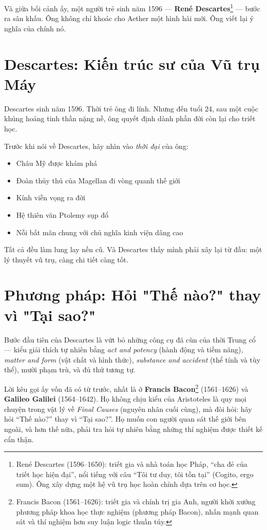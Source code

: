 Và giữa bối cảnh ấy, một người trẻ sinh năm 1596 — \textbf{René Descartes}\footnote{René Descartes (1596--1650): triết gia và nhà toán học Pháp, “cha đẻ của triết học hiện đại”, nổi tiếng với câu “Tôi tư duy, tôi tồn tại” (Cogito, ergo sum). Ông xây dựng một hệ vũ trụ học hoàn chỉnh dựa trên cơ học.} — bước ra sân khấu. Ông không chỉ khoác cho Aether một hình hài mới. Ông viết lại ý nghĩa của chính nó.


\section{Descartes: Kiến trúc sư của Vũ trụ Máy}

Descartes sinh năm 1596. Thời trẻ ông đi lính. Nhưng đến tuổi 24, sau một cuộc khủng hoảng tinh thần nặng nề, ông quyết định dành phần đời còn lại cho triết học.

Trước khi nói về Descartes, hãy nhìn vào \emph{thời đại} của ông:

\begin{itemize}
  \item Châu Mỹ được khám phá
  \item Đoàn thủy thủ của Magellan đi vòng quanh thế giới
  \item Kính viễn vọng ra đời
  \item Hệ thiên văn Ptolemy sụp đổ
  \item Nỗi bất mãn chung với chủ nghĩa kinh viện dâng cao
\end{itemize}

Tất cả đều làm lung lay nền cũ. Và Descartes thấy mình phải xây lại từ đầu: một lý thuyết vũ trụ, càng chi tiết càng tốt.


\section{Phương pháp: Hỏi "Thế nào?" thay vì "Tại sao?"}

Bước đầu tiên của Descartes là vứt bỏ những công cụ đã cùn của thời Trung cổ — kiểu giải thích tự nhiên bằng \emph{act and potency} (hành động và tiềm năng), \emph{matter and form} (vật chất và hình thức), \emph{substance and accident} (thể tính và tùy thể), mười phạm trù, và đủ thứ tương tự.

Lời kêu gọi ấy vốn đã có từ trước, nhất là ở \textbf{Francis Bacon}\footnote{Francis Bacon (1561--1626): triết gia và chính trị gia Anh, người khởi xướng phương pháp khoa học thực nghiệm (phương pháp Bacon), nhấn mạnh quan sát và thí nghiệm hơn suy luận logic thuần túy.} (1561--1626) và \textbf{Galileo Galilei} (1564--1642). Họ không chịu kiểu của Aristoteles là quy mọi chuyện trong vật lý về \emph{Final Causes} (nguyên nhân cuối cùng), mà đòi hỏi: hãy hỏi “Thế nào?” thay vì “Tại sao?”. Họ muốn con người quan sát thế giới bên ngoài, và hơn thế nữa, phải tra hỏi tự nhiên bằng những thí nghiệm được thiết kế cẩn thận.

